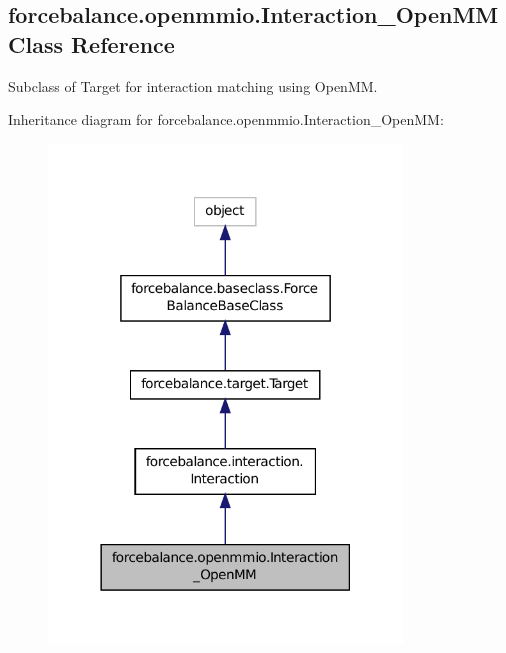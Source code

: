 \hypertarget{classforcebalance_1_1openmmio_1_1Interaction__OpenMM}{\subsection{forcebalance.\-openmmio.\-Interaction\-\_\-\-Open\-M\-M Class Reference}
\label{classforcebalance_1_1openmmio_1_1Interaction__OpenMM}
}


Subclass of Target for interaction matching using Open\-M\-M.  




Inheritance diagram for forcebalance.\-openmmio.\-Interaction\-\_\-\-Open\-M\-M\-:
\nopagebreak
\begin{figure}[H]
\begin{center}
\leavevmode
\includegraphics[width=266pt]{classforcebalance_1_1openmmio_1_1Interaction__OpenMM__inherit__graph}
\end{center}
\end{figure}


